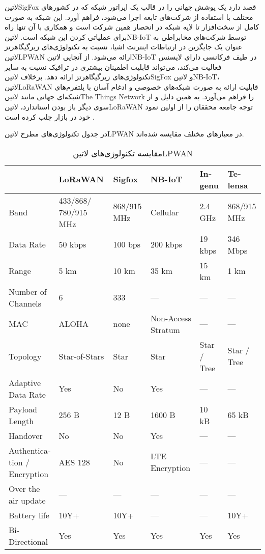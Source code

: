 ‌لاتین{SigFox} قصد دارد یک پوشش جهانی را در قالب یک اپراتور شبکه که در کشورهای مختلف با استفاده از شرکت‌های تابعه اجرا می‌شود، فراهم آورد.
این شبکه به صورت کامل از سخت‌افزار تا لایه شبکه در انحصار همین شرکت است و همکاری با آن تنها راه برای عملیاتی کردن این شبکه است.
‌لاتین{NB-IoT} توسط شرکت‌های مخابراطی به عنوان یک جایگزین در ارتباطات اینترنت اشیا، نسبت به تکنولوژی‌های زیرگیگاهرتز ‌لاتین{LPWAN} ارائه می‌شود.
از آنجایی ‌لاتین{NB-IoT} در طیف فرکانسی دارای لایسنس فعالیت می‌کند، می‌تواند قابلیت اطمینان بیشتری در ترافیک نسبت به سایر تکنولوژی‌های زیرگیگاهرتز ارائه دهد.
برخلاف ‌لاتین{SigFox} و ‌لاتین{NB-IoT}، ‌لاتین{LoRaWAN} قابلیت ارائه به صورت شبکه‌های خصوصی و ادغام آسان با پلتفرم‌های شبکه‌ای جهانی مانند ‌لاتین{The Things Network} را فراهم می‌آورد.
به همین دلیل و از سوی دیگر باز بودن استاندارد، ‌لاتین{LoRaWAN} توجه جامعه محققان را از اولین نمود خود در بازار جلب کرده است
.

در جدول  تکنولوژی‌های مطرح ‌لاتین{LPWAN} در معیارهای مختلف مقایسه شده‌اند.

\begin{table}
\caption{مقایسه تکنولوژی‌های ‌لاتین{LPWAN}   }
\label{جدول: مقایسه تکنولوژی‌های LPWAN}
\begin{latin}\begin{tabularx}
  {\textwidth}
  {|*{6}{X|}}
  \toprule
  &
  LoRaWAN &
  Sigfox &
  NB-IoT &
  Ingenu &
  Telensa \\
  \midrule
  Band &
  433/868/ 780/915 MHz &
  868/915 MHz &
  Cellular &
  2.4 GHz &
  868/915 MHz \\
  \midrule
  Data Rate &
  50 kbps &
  100 bps &
  200 kbps &
  19 kbps &
  346 Mbps \\
  \midrule
  Range &
  5 km &
  10 km &
  35 km &
  15 km &
  1 km \\
  \midrule
  Number of Channels &
  6 &
  333 &
  --- &
  --- &
  --- \\
  \midrule
  MAC &
  ALOHA &
  none &
  Non-Access Stratum &
  --- &
  --- \\
  \midrule
  Topology &
  Star-of-Stars &
  Star &
  Star &
  Star / Tree &
  Star / Tree \\
  \midrule
  Adaptive Data Rate &
  Yes &
  No &
  Yes &
  --- &
  --- \\
  \midrule
  Payload Length &
  256 B &
  12 B &
  1600 B &
  10 kB &
  65 kB \\
  \midrule
  Handover &
  No &
  No &
  Yes &
  --- &
  --- \\
  \midrule
  Authentication / Encryption &
  AES 128 &
  No &
  LTE Encryption &
  --- &
  --- \\
  \midrule
  Over the air update &
  --- &
  --- &
  --- &
  --- &
  --- \\
  \midrule
  Battery life &
  10Y+ &
  10Y+ &
  --- &
  --- &
  10Y+ \\
  Bi-Directional &
  Yes &
  Yes &
  Yes &
  Yes &
  Yes \\
  \bottomrule
\end{tabularx}\end{latin}
\end{table}

